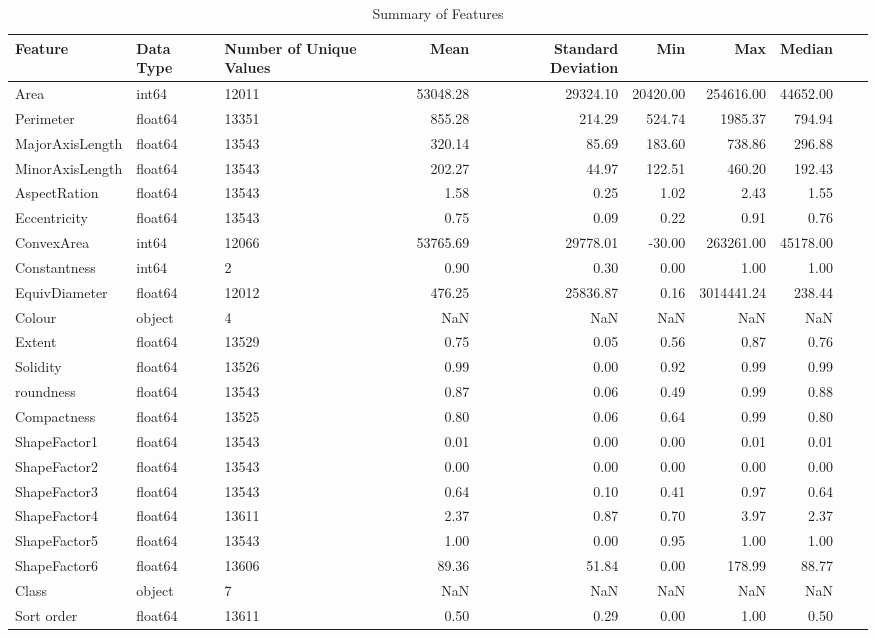 \begin{table}
\caption{Summary of Features}
\begin{tabular}{|l|l|l|r|r|r|r|r|r|r|}
\toprule
Feature & Data Type & Number of Unique Values & Mean & Standard Deviation & Min & Max & Median \\
\midrule
Area & int64 & 12011 & 53048.28 & 29324.10 & 20420.00 & 254616.00 & 44652.00 \\
Perimeter & float64 & 13351 & 855.28 & 214.29 & 524.74 & 1985.37 & 794.94 \\
MajorAxisLength & float64 & 13543 & 320.14 & 85.69 & 183.60 & 738.86 & 296.88 \\
MinorAxisLength & float64 & 13543 & 202.27 & 44.97 & 122.51 & 460.20 & 192.43 \\
AspectRation & float64 & 13543 & 1.58 & 0.25 & 1.02 & 2.43 & 1.55 \\
Eccentricity & float64 & 13543 & 0.75 & 0.09 & 0.22 & 0.91 & 0.76 \\
ConvexArea & int64 & 12066 & 53765.69 & 29778.01 & -30.00 & 263261.00 & 45178.00 \\
Constantness & int64 & 2 & 0.90 & 0.30 & 0.00 & 1.00 & 1.00 \\
EquivDiameter & float64 & 12012 & 476.25 & 25836.87 & 0.16 & 3014441.24 & 238.44 \\
Colour & object & 4 & NaN & NaN & NaN & NaN & NaN \\
Extent & float64 & 13529 & 0.75 & 0.05 & 0.56 & 0.87 & 0.76 \\
Solidity & float64 & 13526 & 0.99 & 0.00 & 0.92 & 0.99 & 0.99 \\
roundness & float64 & 13543 & 0.87 & 0.06 & 0.49 & 0.99 & 0.88 \\
Compactness & float64 & 13525 & 0.80 & 0.06 & 0.64 & 0.99 & 0.80 \\
ShapeFactor1 & float64 & 13543 & 0.01 & 0.00 & 0.00 & 0.01 & 0.01 \\
ShapeFactor2 & float64 & 13543 & 0.00 & 0.00 & 0.00 & 0.00 & 0.00 \\
ShapeFactor3 & float64 & 13543 & 0.64 & 0.10 & 0.41 & 0.97 & 0.64 \\
ShapeFactor4 & float64 & 13611 & 2.37 & 0.87 & 0.70 & 3.97 & 2.37 \\
ShapeFactor5 & float64 & 13543 & 1.00 & 0.00 & 0.95 & 1.00 & 1.00 \\
ShapeFactor6 & float64 & 13606 & 89.36 & 51.84 & 0.00 & 178.99 & 88.77 \\
Class & object & 7 & NaN & NaN & NaN & NaN & NaN \\
Sort order & float64 & 13611 & 0.50 & 0.29 & 0.00 & 1.00 & 0.50 \\
\bottomrule
\end{tabular}
\end{table}
